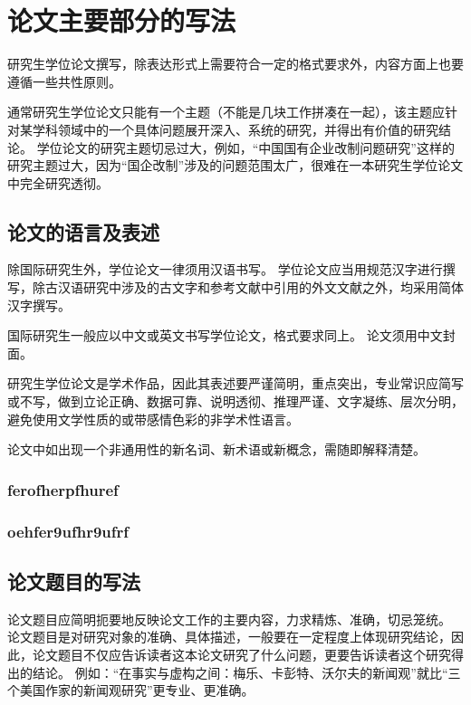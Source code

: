 
\chapter{论文主要部分的写法}

研究生学位论文撰写，除表达形式上需要符合一定的格式要求外，内容方面上也要遵循一些共性原则。

通常研究生学位论文只能有一个主题（不能是几块工作拼凑在一起），该主题应针对某学科领域中的一个具体问题展开深入、系统的研究，并得出有价值的研究结论。
学位论文的研究主题切忌过大，例如，“中国国有企业改制问题研究”这样的研究主题过大，因为“国企改制”涉及的问题范围太广，很难在一本研究生学位论文中完全研究透彻。



\section{论文的语言及表述}

除国际研究生外，学位论文一律须用汉语书写。
学位论文应当用规范汉字进行撰写，除古汉语研究中涉及的古文字和参考文献中引用的外文文献之外，均采用简体汉字撰写。

国际研究生一般应以中文或英文书写学位论文，格式要求同上。
论文须用中文封面。

研究生学位论文是学术作品，因此其表述要严谨简明，重点突出，专业常识应简写或不写，做到立论正确、数据可靠、说明透彻、推理严谨、文字凝练、层次分明，避免使用文学性质的或带感情色彩的非学术性语言。

论文中如出现一个非通用性的新名词、新术语或新概念，需随即解释清楚。

\subsection{ferofherpfhuref}

\subsection{oehfer9ufhr9ufrf}

\section{论文题目的写法}

论文题目应简明扼要地反映论文工作的主要内容，力求精炼、准确，切忌笼统。
论文题目是对研究对象的准确、具体描述，一般要在一定程度上体现研究结论，因此，论文题目不仅应告诉读者这本论文研究了什么问题，更要告诉读者这个研究得出的结论。
例如：“在事实与虚构之间：梅乐、卡彭特、沃尔夫的新闻观”就比“三个美国作家的新闻观研究”更专业、更准确。



